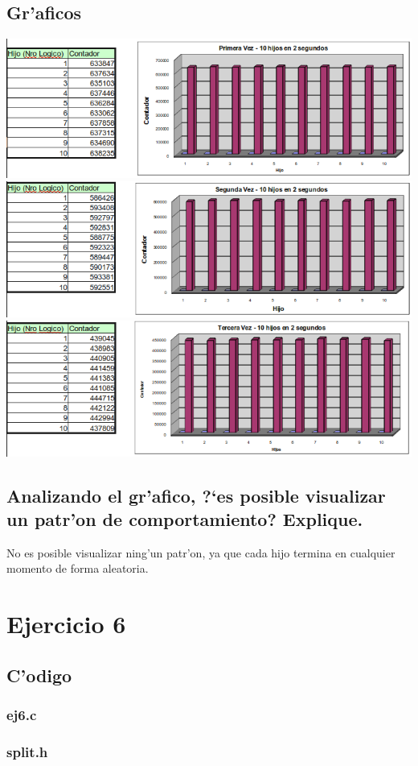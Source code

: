 \documentclass[a4paper,10pt]{article}
\newcommand{\?}{?`}
\begin{document}
\subsection[Punto B]{Gr'aficos}
\begin{center}
 \includegraphics[scale=0.45,keepaspectratio=true]{./ej4/diag1.png}
 \includegraphics[scale=0.45,keepaspectratio=true]{./ej4/diag2.png}
 \includegraphics[scale=0.45,keepaspectratio=true]{./ej4/diag3.png}
\end{center}


\subsection[Punto C]{Analizando el gr'afico, \?es posible visualizar un patr'on de comportamiento? Explique.}
No es posible visualizar ning'un patr'on, ya que cada hijo termina en cualquier momento de forma aleatoria.

\section{Ejercicio 6}
\subsection{C'odigo}
\subsubsection{ej6.c}

\subsubsection{split.h}

\end{document}

